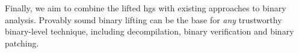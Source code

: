 
Finally, we aim to combine the lifted \acp{hg} with existing approaches to binary analysis.
Provably sound binary lifting can be the base
for \emph{any} trustworthy binary-level technique,
including decompilation, binary verification and binary patching.
